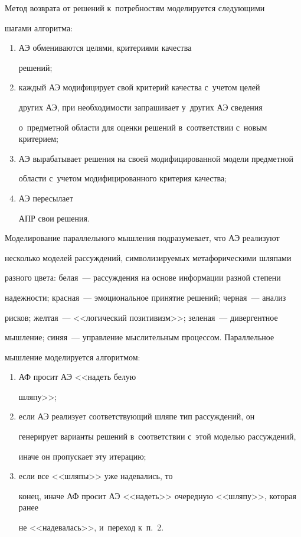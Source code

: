   


  Метод возврата от решений к~потребностям моделируется следующими 


шагами алгоритма: 


\begin{enumerate}[(1)]


\item АЭ обмениваются целями, критериями качества 


решений; 


\item каждый АЭ модифицирует свой критерий качества с~учетом целей 


других АЭ, при необходимости запрашивает у~других АЭ сведения 


о~предметной области для оценки решений в~соответствии с~новым критерием; 


\item АЭ вырабатывает решения на своей модифицированной модели предметной 


области с~учетом модифицированного критерия качества; 


\item АЭ пересылает 


АПР свои решения.


\end{enumerate}





  Моделирование параллельного мышления подразумевает, что АЭ реализуют 


несколько моделей рассуждений, символизируемых метафорическими шляпами 


разного цвета: белая~--- рассуждения на основе информации разной степени 


надежности; красная~--- эмоциональное принятие решений; черная~--- анализ 


рисков; желтая~--- <<логический позитивизм>>; зеленая~--- дивергентное 


мышление; синяя~--- управление мыслительным процессом. Параллельное 


мышление моделируется алгоритмом: 


\begin{enumerate}[(1)]


\item АФ просит АЭ <<надеть белую 


шляпу>>; 


\item если АЭ реализует соответствующий шляпе тип рассуждений, он 


генерирует варианты решений в~соответствии с~этой моделью рассуждений, 


иначе он пропускает эту итерацию; 


\item если все <<шляпы>> уже надевались, то 


конец, иначе АФ просит АЭ <<надеть>> очередную <<шляпу>>, которая ранее 


не <<надевалась>>, и~переход к~п.~2. 


  \end{enumerate}


